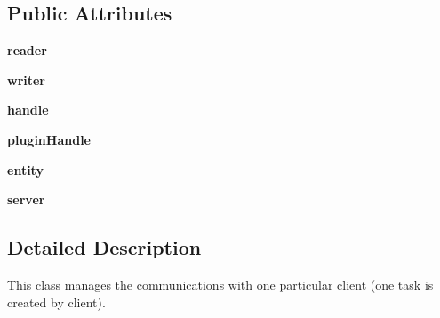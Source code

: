 \subsection*{\-Public \-Attributes}
\begin{DoxyCompactItemize}
\item 
\hypertarget{classnetwork_1_1_server_connection_af5084b55a486eebc40ea6c24cbfcc337}{{\bfseries reader}}\label{classnetwork_1_1_server_connection_af5084b55a486eebc40ea6c24cbfcc337}

\item 
\hypertarget{classnetwork_1_1_server_connection_aef54f357fd46b50f54006b999a2f54ec}{{\bfseries writer}}\label{classnetwork_1_1_server_connection_aef54f357fd46b50f54006b999a2f54ec}

\item 
\hypertarget{classnetwork_1_1_server_connection_ac05b83aca4479be68d65d260a6cb9882}{{\bfseries handle}}\label{classnetwork_1_1_server_connection_ac05b83aca4479be68d65d260a6cb9882}

\item 
\hypertarget{classnetwork_1_1_server_connection_ad94a2f09f0d783fb74bcfd69891280c7}{{\bfseries plugin\-Handle}}\label{classnetwork_1_1_server_connection_ad94a2f09f0d783fb74bcfd69891280c7}

\item 
\hypertarget{classnetwork_1_1_server_connection_ac8e3086a76124ee9449998f99c95adf1}{{\bfseries entity}}\label{classnetwork_1_1_server_connection_ac8e3086a76124ee9449998f99c95adf1}

\item 
\hypertarget{classnetwork_1_1_server_connection_a3b7560c8cd5b2d3bfd5a66a644297d60}{{\bfseries server}}\label{classnetwork_1_1_server_connection_a3b7560c8cd5b2d3bfd5a66a644297d60}

\end{DoxyCompactItemize}


\subsection{\-Detailed \-Description}
\begin{DoxyVerb}
This class manages the communications with one particular client (one
task is created by client).
\end{DoxyVerb}
 

